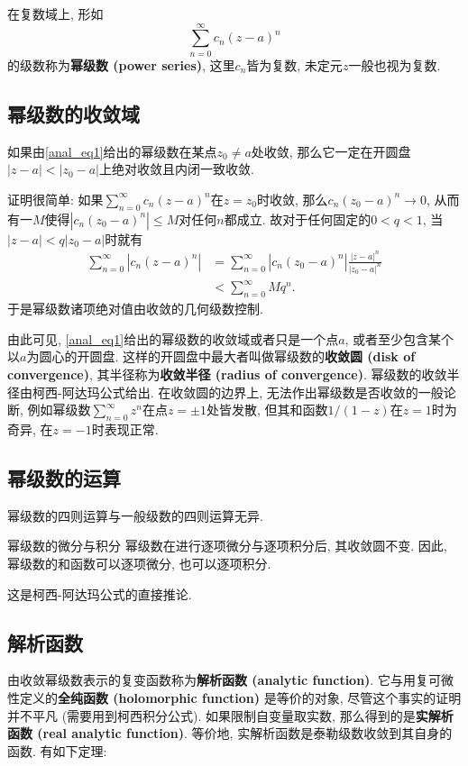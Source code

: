 
在复数域上, 形如
\begin{equation}\label{anal_eq1}
\sum_{n=0}^\infty c_n(z-a)^n
\end{equation}
的级数称为\textbf{幂级数 (power series)}, 这里$c_n$皆为复数, 未定元$z$一般也视为复数. 

\subsection{幂级数的收敛域}
\begin{theorem}{}
如果由\autoref{anal_eq1}给出的幂级数在某点$z_0\neq a$处收敛, 那么它一定在开圆盘$|z-a|<|z_0-a|$上绝对收敛且内闭一致收敛.
\end{theorem}

证明很简单: 如果$\sum_{n=0}^\infty c_n(z-a)^n$在$z=z_0$时收敛, 那么$c_n(z_0-a)^n\to0$, 从而有一$M$使得$|c_n(z_0-a)^n|\leq M$对任何$n$都成立. 故对于任何固定的$0<q<1$, 当$|z-a|<q|z_0-a|$时就有
$$
\begin{aligned}
\sum_{n=0}^\infty |c_n(z-a)^n|
&=\sum_{n=0}^\infty |c_n(z_0-a)^n|\frac{|z-a|^n}{|z_0-a|^n}\\
&<\sum_{n=0}^\infty Mq^n.
\end{aligned}
$$
于是幂级数诸项绝对值由收敛的几何级数控制.

由此可见, \autoref{anal_eq1}给出的幂级数的收敛域或者只是一个点$a$, 或者至少包含某个以$a$为圆心的开圆盘. 这样的开圆盘中最大者叫做幂级数的\textbf{收敛圆 (disk of convergence)}, 其半径称为\textbf{收敛半径 (radius of convergence)}. 幂级数的收敛半径由柯西-阿达玛公式给出. 在收敛圆的边界上, 无法作出幂级数是否收敛的一般论断, 例如幂级数$\sum_{n=0}^\infty z^n$在点$z=\pm1$处皆发散, 但其和函数$1/(1-z)$在$z=1$时为奇异, 在$z=-1$时表现正常.

\subsection{幂级数的运算}
幂级数的四则运算与一般级数的四则运算无异.

\begin{theorem}{幂级数的微分与积分}
幂级数在进行逐项微分与逐项积分后, 其收敛圆不变. 因此, 幂级数的和函数可以逐项微分, 也可以逐项积分.
\end{theorem}
这是柯西-阿达玛公式的直接推论. 

\subsection{解析函数}
由收敛幂级数表示的复变函数称为\textbf{解析函数 (analytic function)}. 它与用复可微性定义的\textbf{全纯函数 (holomorphic function)} 是等价的对象, 尽管这个事实的证明并不平凡 (需要用到柯西积分公式). 如果限制自变量取实数, 那么得到的是\textbf{实解析函数 (real analytic function)}. 等价地, 实解析函数是泰勒级数收敛到其自身的函数. 有如下定理:

